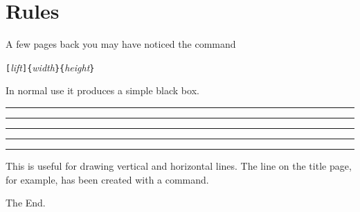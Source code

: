 \section{Rules}\label{sec:rule}

A few pages back you may have noticed the command

\begin{lscommand}
  \verb|[|\emph{lift}\verb|]{|\emph{width}\verb|}{|\emph{height}\verb|}|
\end{lscommand}

\noindent In normal use it produces a simple black box.

\begin{example}
\rule{3mm}{.1pt}%
\rule[-1mm]{5mm}{1cm}%
\rule{3mm}{.1pt}%
\rule[1mm]{1cm}{5mm}%
\rule{3mm}{.1pt}
\end{example}

\noindent This is useful for drawing vertical and horizontal
lines. The line on the title page, for example, has been created with a
 command.

\bigskip
\begin{FlushRight}
  The End.
\end{FlushRight}

%

